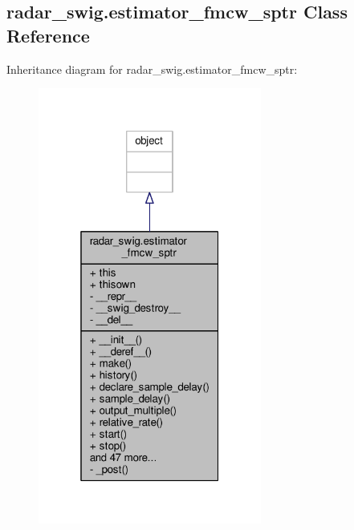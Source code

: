\subsection{radar\+\_\+swig.\+estimator\+\_\+fmcw\+\_\+sptr Class Reference}
\label{classradar__swig_1_1estimator__fmcw__sptr}


Inheritance diagram for radar\+\_\+swig.\+estimator\+\_\+fmcw\+\_\+sptr\+:
\nopagebreak
\begin{figure}[H]
\begin{center}
\leavevmode
\includegraphics[width=208pt]{df/d7f/classradar__swig_1_1estimator__fmcw__sptr__inherit__graph}
\end{center}
\end{figure}



